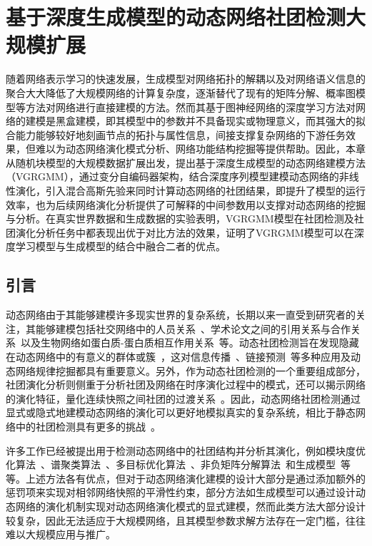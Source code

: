\baselineskip 20pt


\chapter{基于深度生成模型的动态网络社团检测大规模扩展}
\label{chap:6}

随着网络表示学习的快速发展，生成模型对网络拓扑的解耦以及对网络语义信息的聚合大大降低了大规模网络的计算复杂度，逐渐替代了现有的矩阵分解、概率图模型等方法对网络进行直接建模的方法。然而其基于图神经网络的深度学习方法对网络的建模是黑盒建模，即其模型中的参数并不具备现实或物理意义，而其强大的拟合能力能够较好地刻画节点的拓扑与属性信息，间接支撑复杂网络的下游任务效果，但难以为动态网络演化模式分析、网络功能结构挖掘等提供帮助。因此，本章从随机块模型的大规模数据扩展出发，提出基于深度生成模型的动态网络建模方法（VGRGMM），通过变分自编码器架构，结合深度序列模型建模动态网络的非线性演化，引入混合高斯先验来同时计算动态网络的社团结果，即提升了模型的运行效率，也为后续网络演化分析提供了可解释的中间参数用以支撑对动态网络的挖掘与分析。在真实世界数据和生成数据的实验表明，VGRGMM模型在社团检测及社团演化分析任务中都表现出优于对比方法的效果，证明了VGRGMM模型可以在深度学习模型与生成模型的结合中融合二者的优点。



\section{引言\label{chap6:intro}}


动态网络由于其能够建模许多现实世界的复杂系统，长期以来一直受到研究者的关注，其能够建模包括社交网络中的人员关系~\cite{newman2004finding}、学术论文之间的引用关系与合作关系~\cite{gopalan2013efficient,chikhaoui2015new}以及生物网络如蛋白质-蛋白质相互作用关系~\cite{palla2005uncovering,zhang2019relational}等。动态社团检测旨在发现隐藏在动态网络中的有意义的群体或簇~\cite{7384503,rossetti2018community}，这对信息传播~\cite{del2016spreading}、链接预测~\cite{lu2015toward,yu2017link,Ma.2019.Ming}等多种应用及动态网络规律\cite{laurienti2009modularity}挖掘都具有重要意义。另外，作为动态社团检测的一个重要组成部分，社团演化分析则侧重于分析社团及网络在时序演化过程中的模式，还可以揭示网络的演化特征，量化连续快照之间社团的过渡关系~\cite{tang2014detecting}。因此，动态网络社团检测通过显式或隐式地建模动态网络的演化可以更好地模拟真实的复杂系统，相比于静态网络中的社团检测具有更多的挑战~\cite{rossetti2018community}。


许多工作已经被提出用于检测动态网络中的社团结构并分析其演化，例如模块度优化算法~\cite{Mucha.2010.Onnela}、谱聚类算法~\cite{liu2018global}、多目标优化算法~\cite{Zhang.2017.Niu,Zhang.2020.Jin}、非负矩阵分解算法~\cite{Ma.2017.Dong}和生成模型~\cite{pensky2019spectral}等等。上述方法各有优点，但对于动态网络演化建模的设计大部分是通过添加额外的惩罚项来实现对相邻网络快照的平滑性约束，部分方法如生成模型可以通过设计动态网络的演化机制实现对动态网络演化模式的显式建模，然而此类方法大部分设计较复杂，因此无法适应于大规模网络，且其模型参数求解方法存在一定门槛，往往难以大规模应用与推广。


